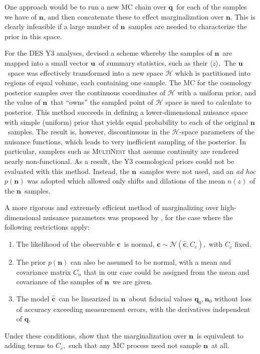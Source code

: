 \documentclass[linenumbers, onecolumn]{aastex63}
\newcommand{\vecc}{\ensuremath{\mathbf{c}}}
\newcommand{\vecq}{\ensuremath{\mathbf{q}}}
\newcommand{\vecn}{\ensuremath{\mathbf{n}}}
\newcommand{\vecu}{\ensuremath{\mathbf{u}}}
\newcommand{\hatc}{\ensuremath{\hat{\mathbf{c}}}}
\newcommand{\covm}{C}
\begin{document}
One approach would be to run a new MC chain over \vecq\ for each of the samples we have of \vecn, and then concatenate these to effect marginalization over \vecn.  This is clearly infeasible if a large number of \vecn\ samples are needed to characterize the prior in this space.

For the DES Y3 analyses, \citet{hyperrank} devised a scheme whereby the samples of \vecn\ are mapped into a small vector \vecu\ of summary statistics, such as their $\langle z \rangle,$  The \vecu\ space was effectively transformed into a new space $\mathcal{H}$ which is partitioned into regions of equal volume, each containing one sample.  The MC for the cosmology posterior samples over the continuous coordinates of $\mathcal{H}$ with a uniform prior, and the value of \vecn\ that ``owns'' the sampled point of $\mathcal{H}$ space is used to calculate to posterior. This method succeeds in defining a lower-dimensional nuisance space with simple (uniform) prior that yields equal probability to each of the original \vecn\ samples.  The result is, however, discontinuous in the $\mathcal{H}$-space parameters of the nuisance functions, which leads to very inefficient sampling of the posterior.  In particular, samplers such as \textsc{MultiNest} that assume continuity are rendered nearly non-functional.  As a result, the Y3 cosmological priors could not be evaluated with this method.  Instead, the \vecn\ samples were not used, and an \textit{ad hoc} $p(\vecn)$ was adopted which allowed only shifts and dilations of the mean $n(z)$ of the \vecn\ samples.

A more rigorous and extremely efficient method of marginalizing over high-dimensional nuisance parameters was proposed by \citet{hans}, for the case where the following restrictions apply:
\begin{enumerate}
\item The likelihood of the observable \vecc\ is normal, $\vecc \sim \mathcal{N}( \hatc, \covm_c),$ with $\covm_c$ fixed.
\item The prior $p(\vecn)$ can also be assumed to be normal, with a mean and covariance matrix $\covm_n$ that in our case could be assigned from the mean and covariance of the samples of \vecn\ we are given.
\item The model \hatc\ can be linearized in \vecn\ about fiducial values $\vecq_0, \vecn_0$ without loss of accuracy exceeding measurement errors, with the derivatives independent of \vecq.
\end{enumerate}
Under these conditions, \citet{hans} show that the marginalization over \vecn\ is equivalent to adding terms to $\covm_c,$ such that any MC process need not sample \vecn\ at all.
\end{document}
